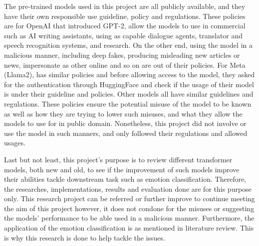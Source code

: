 The pre-trained models used in this project are all publicly available, and they have their own responsible use guideline, policy and regulations. These policies are for OpenAI that introduced GPT-2, allow the models to use in commercial such as AI writing assistants, using as capable dialogue agents, translator and speech recognition systems, and research. On the other end, using the model in a malicious manner, including deep fakes, producing misleading new articles or news, impersonate as other online and so on are out of their policies\cite{OpenAI_policy_2019}. For Meta (Llama2), has similar policies and before allowing access to the model, they asked for the authentication through HuggingFace and check if the usage of their model is under their guideline and policies\cite{Meta_guideline_2024}. Other models all have similar guidelines and regulations. These policies ensure the potential misuse of the model to be known as well as how they are trying to lower such misuses, and what they allow the models to use for in public domain. Nonetheless, this project did not involve or use the model in such manners, and only followed their regulations and allowed usages.

Last but not least, this project's purpose is to review different transformer models, both new and old, to see if the improvement of such models improve their abilities tackle downstream task such as emotion classification. Therefore, the researches, implementations, results and evaluation done are for this purpose only. This research project can be referred or further improve to continue meeting the aim of this project however, it does not condone for the misuses or suggesting the models' performance to be able used in a malicious manner. Furthermore, the application of the emotion classification is as mentioned in literature review. This is why this research is done to help tackle the issues.